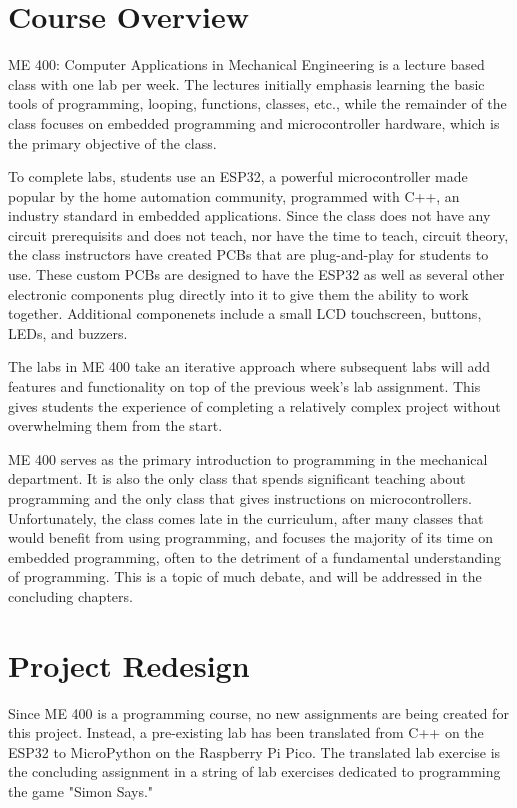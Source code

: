 \section{Course Overview}

ME 400: Computer Applications in Mechanical Engineering is a lecture based class with
one lab per week. The lectures initially emphasis learning the basic tools of
programming, looping, functions, classes, etc., while the remainder of the class
focuses on embedded programming and microcontroller hardware, which is the primary
objective of the class.

To complete labs, students use an ESP32, a powerful microcontroller made popular by
the home automation community, programmed with C++, an industry standard in embedded
applications. Since the class does not have any circuit prerequisits and does not 
teach, nor have the time to teach, circuit theory, the class instructors have created
PCBs that are plug-and-play for students to use. These custom PCBs are designed to have
the ESP32 as well as several other electronic components plug directly into it to
give them the ability to work together. Additional componenets include a small LCD 
touchscreen, buttons, LEDs, and buzzers. 

The labs in ME 400 take an iterative approach where subsequent labs will add features
and functionality on top of the previous week's lab assignment. This gives students
the experience of completing a relatively complex project without overwhelming them 
from the start. 

ME 400 serves as the primary introduction to programming in the mechanical department.
It is also the only class that spends significant teaching about programming and the
only class that gives instructions on microcontrollers. Unfortunately, the class comes
late in the curriculum, after many classes that would benefit from using programming,
and focuses the majority of its time on embedded programming, often to the detriment
of a fundamental understanding of programming. This is a topic of much debate, and
will be addressed in the concluding chapters.


\section{Project Redesign}

Since ME 400 is a programming course, no new assignments are being created for this
project. Instead, a pre-existing lab has been translated from C++ on the ESP32 to
MicroPython on the Raspberry Pi Pico. The translated lab exercise is the concluding
assignment in a string of lab exercises dedicated to programming the game "Simon Says."

